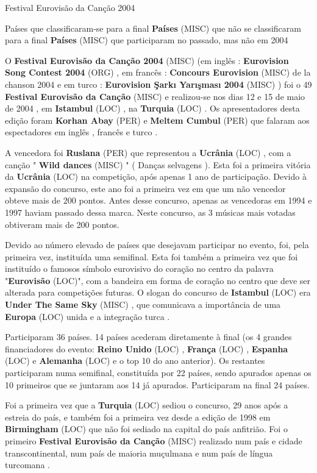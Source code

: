 \documentclass[12pt,a4paper]{article}
\begin{document}
Festival Eurovisão da Canção 2004



Países que classificaram-se para a final \textbf{Países} (MISC) que não se classificaram para a final \textbf{Países} (MISC) que participaram no passado, mas não em 2004

O \textbf{Festival Eurovisão da Canção 2004} (MISC) (em inglês : \textbf{Eurovision Song Contest 2004} (ORG) , em francês : \textbf{Concours Eurovision} (MISC) de la chanson 2004 e em turco : \textbf{Eurovision Şarkı Yarışması 2004} (MISC) ) foi o 49 \textbf{Festival Eurovisão da Canção} (MISC) e realizou-se nos dias 12 e 15 de maio de 2004 , em \textbf{Istambul} (LOC) , na \textbf{Turquia} (LOC) . Os apresentadores desta edição foram \textbf{Korhan Abay} (PER) e \textbf{Meltem Cumbul} (PER) que falaram aos espectadores em inglês , francês e turco .

A vencedora foi \textbf{Ruslana} (PER) que representou a \textbf{Ucrânia} (LOC) , com a canção " \textbf{Wild dances} (MISC) " ( Danças selvagens ). Esta foi a primeira vitória da \textbf{Ucrânia} (LOC) na competição, após apenas 1 ano de participação. Devido à expansão do concurso, este ano foi a primeira vez em que um não vencedor obteve mais de 200 pontos. Antes desse concurso, apenas as vencedoras em 1994 e 1997 haviam passado dessa marca. Neste concurso, as 3 músicas mais votadas obtiveram mais de 200 pontos.

Devido ao número elevado de países que desejavam participar no evento, foi, pela primeira vez, instituída uma semifinal. Esta foi também a primeira vez que foi instituído o famosos símbolo eurovisivo do coração no centro da palavra "\textbf{Eurovisão} (LOC)", com a bandeira em forma de coração no centro que deve ser alterada para competições futuras. O slogan do concurso de \textbf{Istambul} (LOC) era \textbf{Under The Same Sky} (MISC) , que comunicava a importância de uma \textbf{Europa} (LOC) unida e a integração turca .

Participaram 36 países. 14 países acederam diretamente à final (os 4 grandes financiadores do evento: \textbf{Reino Unido} (LOC) , \textbf{França} (LOC) , \textbf{Espanha} (LOC) e \textbf{Alemanha} (LOC) e o top 10 do ano anterior). Os restantes participaram numa semifinal, constituída por 22 países, sendo apurados apenas os 10 primeiros que se juntaram aos 14 já apurados. Participaram na final 24 países.

Foi a primeira vez que a \textbf{Turquia} (LOC) sediou o concurso, 29 anos após a estreia do país, e também foi a primeira vez desde a edição de 1998 em \textbf{Birmingham} (LOC) que não foi sediado na capital do país anfitrião. Foi o primeiro \textbf{Festival Eurovisão da Canção} (MISC) realizado num país e cidade transcontinental, num país de maioria muçulmana e num país de língua turcomana .
\end{document}
